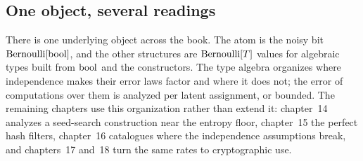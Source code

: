 \subsection*{One object, several readings}

There is one underlying object across the book. The atom is the noisy bit
$\mathrm{Bernoulli}[\mathrm{bool}]$, and the other structures are $\mathrm{Bernoulli}[T]$ values for
algebraic types built from $\mathrm{bool}$ and the constructors. The type algebra
organizes where independence makes their error laws factor and where it does
not; the error of computations over them is analyzed per latent assignment, or
bounded. The remaining chapters use this organization rather than extend it:
chapter~14 analyzes a seed-search construction near the entropy floor,
chapter~15 the perfect hash filters, chapter~16 catalogues where the
independence assumptions break, and chapters~17 and~18 turn the same rates to
cryptographic use.
